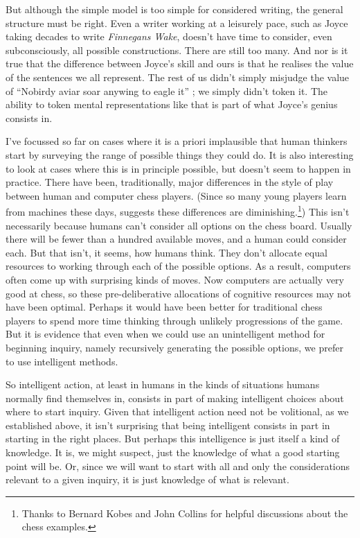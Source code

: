 But although the simple model is too simple for considered writing, the general structure must be right. Even a writer working at a leisurely pace, such as Joyce taking decades to write \emph{Finnegans Wake}, doesn't have time to consider, even subconsciously, all possible constructions. There are still too many. And nor is it true that the difference between Joyce's skill and ours is that he realises the value of the sentences we all represent. The rest of us didn't simply misjudge the value of ``Nobirdy aviar soar anywing to eagle it'' \cite[p. 505]{Joyce1939}; we simply didn't token it. The ability to token mental representations like that is part of what Joyce's genius consists in.

I've focussed so far on cases where it is a priori implausible that human thinkers start by surveying the range of possible things they could do. It is also interesting to look at cases where this is in principle possible, but doesn't seem to happen in practice. There have been, traditionally, major differences in the style of play between human and computer chess players. (Since so many young players learn from machines these days, \citet{Kasparov2010} suggests these differences are diminishing.\footnote{Thanks to Bernard Kobes and John Collins for helpful discussions about the chess examples.}) This isn't necessarily because humans can't consider all options on the chess board. Usually there will be fewer than a hundred available moves, and a human could consider each. But that isn't, it seems, how humans think. They don't allocate equal resources to working through each of the possible options. As a result, computers often come up with surprising kinds of moves. Now computers are actually very good at chess, so these pre-deliberative allocations of cognitive resources may not have been optimal. Perhaps it would have been better for traditional chess players to spend more time thinking through unlikely progressions of the game. But it is evidence that even when we could use an unintelligent method for beginning inquiry, namely recursively generating the possible options, we prefer to use intelligent methods.

So intelligent action, at least in humans in the kinds of situations humans normally find themselves in, consists in part of making intelligent choices about where to start inquiry. Given that intelligent action need not be volitional, as we established above, it isn't surprising that being intelligent consists in part in starting in the right places. But perhaps this intelligence is just itself a kind of knowledge. It is, we might suspect, just the knowledge of what a good starting point will be. Or, since we will want to start with all and only the considerations relevant to a given inquiry, it is just knowledge of what is relevant. 

